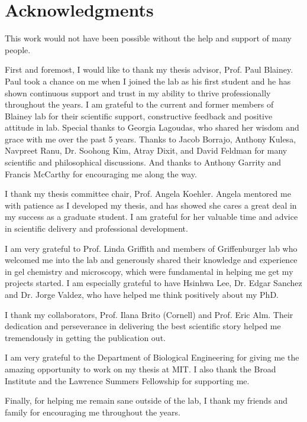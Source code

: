 \section*{Acknowledgments}
This work would not have been possible without the help and support of many people. 


First and foremost, I would like to thank my thesis advisor, Prof. Paul Blainey. Paul took a chance on me when I joined the lab as his first student and he has shown continuous support and trust in my ability to thrive professionally throughout the years. I am grateful to the current and former members of Blainey lab for their scientific support, constructive feedback and positive attitude in lab. Special thanks to Georgia Lagoudas, who shared her wisdom and grace with me over the past 5 years. Thanks to Jacob Borrajo, Anthony Kulesa, Navpreet Ranu, Dr. Soohong Kim, Atray Dixit, and David Feldman for many scientific and philosophical discussions. And thanks to Anthony Garrity and Francis McCarthy for encouraging me along the way. 

I thank my thesis committee chair, Prof. Angela Koehler. Angela mentored me with patience as I developed my thesis, and has showed she cares a great deal in my success as a graduate student. I am grateful for her valuable time and advice in scientific delivery and professional development. 

I am very grateful to Prof. Linda Griffith and members of Griffenburger lab who welcomed me into the lab and generously shared their knowledge and experience in gel chemistry and microscopy, which were fundamental in helping me get my projects started. I am especially grateful to have Hsinhwa Lee, Dr. Edgar Sanchez and Dr. Jorge Valdez, who have helped me think positively about my PhD. 

I thank my collaborators, Prof. Ilana Brito (Cornell) and Prof. Eric Alm. Their dedication and perseverance in delivering the best scientific story helped me tremendously in getting the publication out. 

I am very grateful to the Department of Biological Engineering for giving me the amazing opportunity to work on my thesis at MIT. I also thank the Broad Institute and the Lawrence Summers Fellowship for supporting me. 

Finally, for helping me remain sane outside of the lab, I thank my friends and family for encouraging me throughout the years. 
